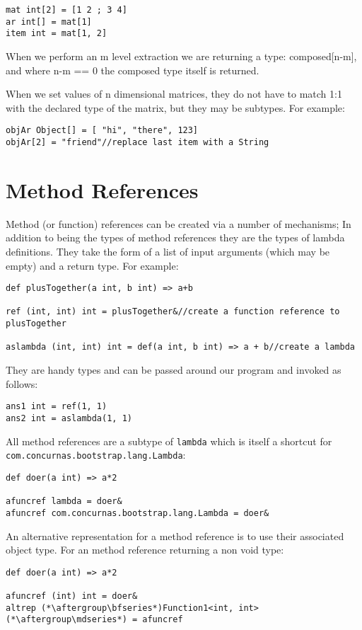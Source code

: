 \documentclass[conc-doc]{subfiles}
\begin{document}
\begin{lstlisting}
mat int[2] = [1 2 ; 3 4]
ar int[] = mat[1]
item int = mat[1, 2]
\end{lstlisting}

When we perform an m level extraction we are returning a type: composed[n-m], and where n-m == 0 the composed type itself is returned.

When we set values of n dimensional matrices, they do not have to match 1:1 with the declared type of the matrix, but they may be subtypes. For example:

\begin{lstlisting}
objAr Object[] = [ "hi", "there", 123]
objAr[2] = "friend"//replace last item with a String
\end{lstlisting}

\section{Method References}
Method (or function) references can be created via a number of mechanisms; In addition to being the types of method references they are the types of lambda definitions. They take the form of a list of input arguments (which may be empty) and a return type. For example:

\begin{lstlisting}
def plusTogether(a int, b int) => a+b

ref (int, int) int = plusTogether&//create a function reference to plusTogether

aslambda (int, int) int = def(a int, b int) => a + b//create a lambda
\end{lstlisting}

They are handy types and can be passed around our program and invoked as follows:
\begin{lstlisting}
ans1 int = ref(1, 1)
ans2 int = aslambda(1, 1)
\end{lstlisting}

All method references are a subtype of \lstinline{lambda} which is itself a shortcut for \lstinline{com.concurnas.bootstrap.lang.Lambda}:

\begin{lstlisting}
def doer(a int) => a*2

afuncref lambda = doer&
afuncref com.concurnas.bootstrap.lang.Lambda = doer&
\end{lstlisting}

An alternative representation for a method reference is to use their associated object type. For an method reference returning a non void type:
\begin{lstlisting}
def doer(a int) => a*2

afuncref (int) int = doer&
altrep (*\aftergroup\bfseries*)Function1<int, int>(*\aftergroup\mdseries*) = afuncref
\end{lstlisting}
\end{document}
